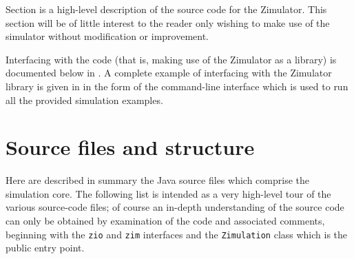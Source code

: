 

Section  is a high-level description of the source code
for the Zimulator. This section will be of little interest to the reader
only wishing to make use of the simulator without modification or
improvement.

Interfacing with the code (that is, making use of the Zimulator as a
library) is documented below in .
A complete example of interfacing with the Zimulator library is given in
 in the form of the command-line interface which
is used to run all the provided simulation examples.

\section{Source files and structure}
\label{Sec:SFAS}

Here are described in summary the Java source files which comprise the simulation core.
The following list is intended as a very high-level tour of the various source-code files;
of course an in-depth understanding of the source code can only be obtained by examination
of the code and associated comments, beginning with the {\tt zio} and {\tt zim} interfaces
and the {\tt Zimulation} class which is the public entry point.

